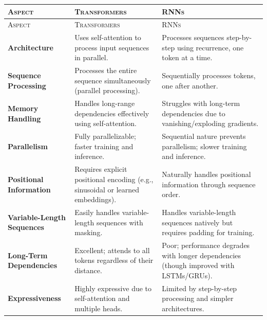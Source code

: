 \renewcommand{\arraystretch}{1.5}
\setlength{\tabcolsep}{8pt}

\begin{longtable}{|>{\raggedright\arraybackslash}p{3.5cm}|>{\raggedright\arraybackslash}p{6cm}|>{\raggedright\arraybackslash}p{6cm}|}
\hline
\textsc{Aspect} & \textsc{Transformers} & \textsc{RNNs} \\ \hline
\endfirsthead
\hline
\textsc{Aspect} & \textsc{Transformers} & \textsc{RNNs} \\ \hline
\endhead
\hline
\endfoot
\hline
\endlastfoot

\textbf{Architecture} & Uses self-attention to process input sequences in parallel. & Processes sequences step-by-step using recurrence, one token at a time. \\ \hline

\textbf{Sequence Processing} & Processes the entire sequence simultaneously (parallel processing). & Sequentially processes tokens, one after another. \\ \hline

\textbf{Memory Handling} & Handles long-range dependencies effectively using self-attention. & Struggles with long-term dependencies due to vanishing/exploding gradients. \\ \hline

\textbf{Parallelism} & Fully parallelizable; faster training and inference. & Sequential nature prevents parallelism; slower training and inference. \\ \hline

\textbf{Positional Information} & Requires explicit positional encoding (e.g., sinusoidal or learned embeddings). & Naturally handles positional information through sequence order. \\ \hline

\textbf{Variable-Length Sequences} & Easily handles variable-length sequences with masking. & Handles variable-length sequences natively but requires padding for training. \\ \hline

\textbf{Long-Term Dependencies} & Excellent; attends to all tokens regardless of their distance. & Poor; performance degrades with longer dependencies (though improved with LSTMs/GRUs). \\ \hline

\textbf{Expressiveness} & Highly expressive due to self-attention and multiple heads. & Limited by step-by-step processing and simpler architectures. \\ \hline


\end{longtable}
